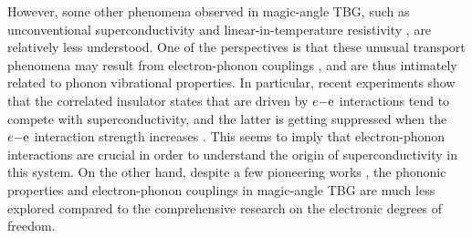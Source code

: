 \documentclass[aps,prl,twocolumn,amsmath,amssymb]{revtex4-2}
\begin{document}
However, some other phenomena observed in magic-angle TBG, such as unconventional superconductivity \cite{cao-nature18-supercond,dean-tbg-science19,marc-tbg-19, efetov-nature19,efetov-nature20,young-tbg-np20,li-tbg-science21,cao-tbg-nematic-science21,efetov-tbg-prl21} and linear-in-temperature resistivity \cite{young-linear-np19,cao-strange-prl20}, are relatively less understood. One of the perspectives is that these unusual transport phenomena may result from electron-phonon couplings \cite{wu-prl18,lian-prl18,wu-linear-prb19,sharma-tbg-phonon-nc21}, and are thus intimately related to phonon vibrational properties. In particular, recent experiments show that the correlated insulator states that are driven by $e\rm{-}e$ interactions tend to compete with superconductivity, and the latter is getting suppressed when the $e\rm{-}e$ interaction strength increases \cite{li-tbg-science21,young-tbg-np20}. This seems to imply that electron-phonon interactions are crucial in order to understand the origin of superconductivity in this system. On the other hand, despite a few pioneering works \cite{balandin-prb13,choi-prb18,wu-prl18,lian-prl18,tbg-raman-nc18,wu-linear-prb19,angeli-tbg-prx19,koshino-tbg-prb19,koshino-prb20,sharma-tbg-phonon-nc21,choi-tbg-prl21},  the phononic properties and electron-phonon couplings in magic-angle TBG are much less explored compared to the comprehensive research on the electronic degrees of freedom.  
\end{document}
